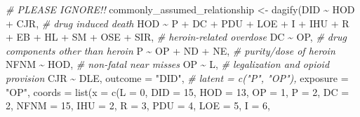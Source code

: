 \documentclass[
]{article}
\newenvironment{Shaded}{\begin{snugshade}}{\end{snugshade}}
\newcommand{\AttributeTok}[1]{\textcolor[rgb]{0.77,0.63,0.00}{#1}}
\newcommand{\CommentTok}[1]{\textcolor[rgb]{0.56,0.35,0.01}{\textit{#1}}}
\newcommand{\DecValTok}[1]{\textcolor[rgb]{0.00,0.00,0.81}{#1}}
\newcommand{\FunctionTok}[1]{\textcolor[rgb]{0.00,0.00,0.00}{#1}}
\newcommand{\NormalTok}[1]{#1}
\newcommand{\OtherTok}[1]{\textcolor[rgb]{0.56,0.35,0.01}{#1}}
\newcommand{\SpecialCharTok}[1]{\textcolor[rgb]{0.00,0.00,0.00}{#1}}
\newcommand{\StringTok}[1]{\textcolor[rgb]{0.31,0.60,0.02}{#1}}
\begin{document}
\begin{Shaded}
\begin{Highlighting}[]
\CommentTok{\# PLEASE IGNORE!!}
\NormalTok{commonly\_assumed\_relationship }\OtherTok{\textless{}{-}} \FunctionTok{dagify}\NormalTok{(DID }\SpecialCharTok{\textasciitilde{}}\NormalTok{ HOD }\SpecialCharTok{+}\NormalTok{ CJR, }\CommentTok{\# drug induced death}
\NormalTok{                                  HOD }\SpecialCharTok{\textasciitilde{}}\NormalTok{ P }\SpecialCharTok{+}\NormalTok{ DC }\SpecialCharTok{+}\NormalTok{ PDU }\SpecialCharTok{+}\NormalTok{ LOE }\SpecialCharTok{+}\NormalTok{ I }\SpecialCharTok{+}\NormalTok{ IHU }\SpecialCharTok{+}\NormalTok{ R }\SpecialCharTok{+}
\NormalTok{                                        EB }\SpecialCharTok{+}\NormalTok{ HL }\SpecialCharTok{+}\NormalTok{ SM }\SpecialCharTok{+}\NormalTok{ OSE }\SpecialCharTok{+}\NormalTok{ SIR, }\CommentTok{\# heroin{-}related overdose}
\NormalTok{                                  DC }\SpecialCharTok{\textasciitilde{}}\NormalTok{ OP, }\CommentTok{\# drug components other than heroin}
\NormalTok{                                  P }\SpecialCharTok{\textasciitilde{}}\NormalTok{ OP }\SpecialCharTok{+}\NormalTok{ ND }\SpecialCharTok{+}\NormalTok{ NE, }\CommentTok{\# purity/dose of heroin}
\NormalTok{                                  NFNM }\SpecialCharTok{\textasciitilde{}}\NormalTok{ HOD, }\CommentTok{\# non{-}fatal near misses}
\NormalTok{                                  OP }\SpecialCharTok{\textasciitilde{}}\NormalTok{ L, }\CommentTok{\# legalization and opioid provision}
\NormalTok{                                  CJR }\SpecialCharTok{\textasciitilde{}}\NormalTok{ DLE,}
                        \AttributeTok{outcome =} \StringTok{"DID"}\NormalTok{,}
                        \CommentTok{\# latent = c("P", "OP"),}
                        \AttributeTok{exposure =} \StringTok{"OP"}\NormalTok{,}
                        \AttributeTok{coords =} \FunctionTok{list}\NormalTok{(}\AttributeTok{x =} \FunctionTok{c}\NormalTok{(}\AttributeTok{L =} \DecValTok{0}\NormalTok{,}
                                            \AttributeTok{DID =} \DecValTok{15}\NormalTok{, }\AttributeTok{HOD =} \DecValTok{13}\NormalTok{,}
                                            \AttributeTok{OP =} \DecValTok{1}\NormalTok{,  }\AttributeTok{P =} \DecValTok{2}\NormalTok{, }\AttributeTok{DC =} \DecValTok{2}\NormalTok{, }\AttributeTok{NFNM =} \DecValTok{15}\NormalTok{,}
                                            \AttributeTok{IHU =} \DecValTok{2}\NormalTok{, }\AttributeTok{R =} \DecValTok{3}\NormalTok{, }\AttributeTok{PDU =} \DecValTok{4}\NormalTok{, }\AttributeTok{LOE =} \DecValTok{5}\NormalTok{, }\AttributeTok{I =} \DecValTok{6}\NormalTok{, }

\end{Highlighting}
\end{Shaded}
\end{document}
